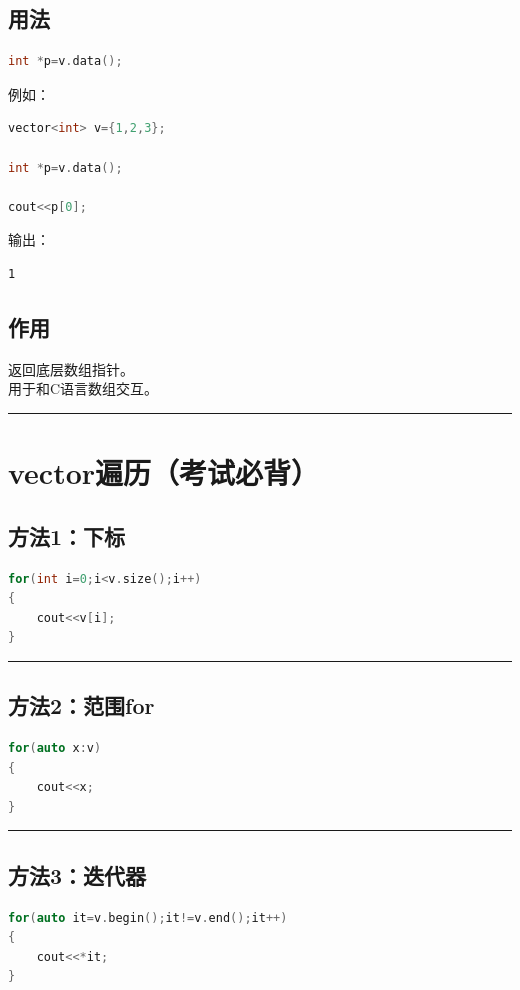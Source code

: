 \documentclass[9pt,twocolumn]{extarticle}
\begin{document}
\subsection{用法}
\begin{lstlisting}[language=C++]
int *p=v.data();
\end{lstlisting}
例如：
\begin{lstlisting}[language=C++]
vector<int> v={1,2,3};

int *p=v.data();

cout<<p[0];
\end{lstlisting}
输出：
\begin{lstlisting}
1
\end{lstlisting}

\subsection{作用}
返回底层数组指针。\\
用于和C语言数组交互。

\noindent\rule{\linewidth}{0.4pt}

\section{vector遍历（考试必背）}

\subsection{方法1：下标}
\begin{lstlisting}[language=C++]
for(int i=0;i<v.size();i++)
{
    cout<<v[i];
}
\end{lstlisting}

\noindent\rule{\linewidth}{0.4pt}

\subsection{方法2：范围for}
\begin{lstlisting}[language=C++]
for(auto x:v)
{
    cout<<x;
}
\end{lstlisting}

\noindent\rule{\linewidth}{0.4pt}

\subsection{方法3：迭代器}
\begin{lstlisting}[language=C++]
for(auto it=v.begin();it!=v.end();it++)
{
    cout<<*it;
}
\end{lstlisting}
\end{document}

